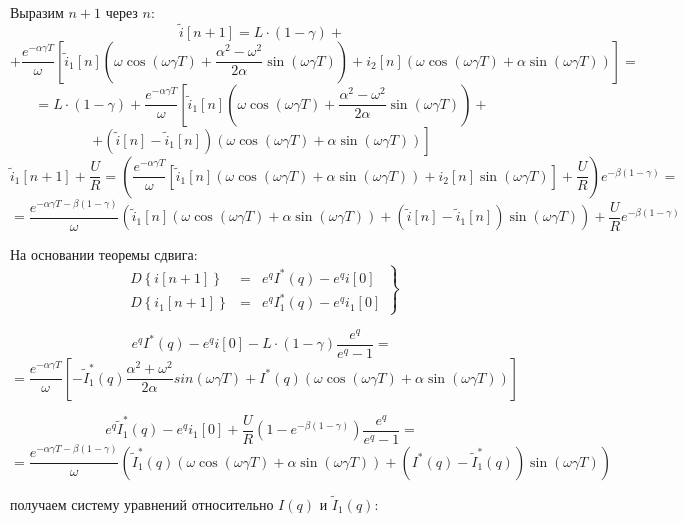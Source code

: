 \documentclass[a4paper,12pt]{article}
\begin{document}
Выразим $n+1$ через $n$:
$$
\tilde{i}[n+1] = L\cdot (1-\gamma) +
$$
$$
+ \frac{e^{-\alpha\gamma T}}{\omega}
\left[
\tilde{i}_1[n] \left(\omega\cos(\omega\gamma T) + \frac{\alpha^2 - \omega^2}{2\alpha}\sin(\omega\gamma T) \right)
+ i_2[n]\left(\omega\cos(\omega\gamma T)  + \alpha\sin(\omega\gamma T)\right)
\right] =
$$ 
$$
= L\cdot (1-\gamma) + \frac{e^{-\alpha\gamma T}}{\omega}
\left[
\tilde{i}_1[n]\left(\omega\cos(\omega\gamma T) + \frac{\alpha^2 - \omega^2}{2\alpha}\sin(\omega\gamma T) \right) \right. +
$$
$$
\left.
+ \left(\tilde{i}[n] - \tilde{i}_1[n]\right)\left(\omega\cos(\omega\gamma T)
+ \alpha\sin(\omega\gamma T)\right)
\right]
$$
$$
\tilde{i}_1[n+1] +\frac{U}{R} = \left(\frac{e^{-\alpha\gamma T}}{\omega} 
\left[ \tilde{i}_1[n] 
\left(\omega\cos(\omega\gamma T) + \alpha \sin(\omega\gamma T)\right)
+ i_2[n] \sin(\omega\gamma T) \right] + \frac{U}{R}\right) e^{-\beta (1-\gamma)} =
$$ 
$$
= \frac{e^{-\alpha\gamma T -\beta(1-\gamma)}}{\omega} \left( \tilde{i}_1[n] 
\left(\omega\cos(\omega\gamma T) + \alpha \sin(\omega\gamma T)\right)
+ \left(\tilde{i}[n] - \tilde{i}_1[n]\right)\sin(\omega\gamma T) \right)
+ \frac{U}{R} e^{-\beta (1-\gamma)}
$$

На основании теоремы сдвига:
$$
\left.
\begin{array}{lcl}
D\left\{i[n+1]\right\} &=& e^q I^*(q) - e^q i[0]\\[1.5mm]
D\left\{i_1[n+1]\right\} &=& e^q I_1^*(q) - e^q i_1[0]
\end{array}
\right\}
$$

$$
e^q I^*(q) - e^qi[0] - L\cdot(1-\gamma)\frac{e^q}{e^q - 1} = 
$$
$$
= \frac{e^{-\alpha\gamma T}}{\omega} \left[
-\tilde{I}_1^*(q) \frac{\alpha^2+\omega^2}{2\alpha} sin(\omega\gamma T) 
+ I^*(q) \left(\omega\cos(\omega\gamma T) + \alpha\sin(\omega\gamma T)\right)
\right]
$$

$$
e^q\tilde{I}^*_1(q) - e^q i_1[0] + 
\frac{U}{R}\left(1- e^{-\beta(1-\gamma)} \right) \frac{e^q}{e^q-1} =
$$
$$
= \frac{e^{-\alpha\gamma T - \beta(1-\gamma)}}{\omega} \left(
\tilde{I}_1^*(q) \left(\omega\cos(\omega\gamma T) + \alpha\sin(\omega\gamma T)\right)
+ \left(I^*(q) - \tilde{I}^*_1(q) \right)\sin(\omega\gamma T)
\right)
$$

получаем систему уравнений относительно $I(q)$ и $\tilde{I}_1(q)$:
\end{document}
